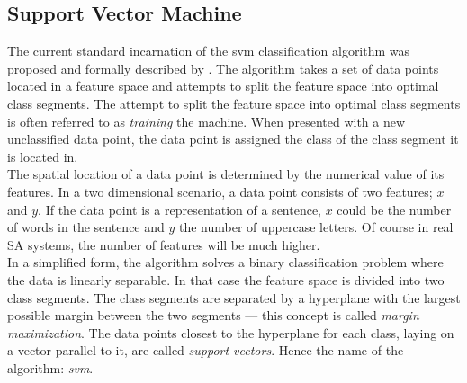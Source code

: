 \subsection*{Support Vector Machine}
\label{sec:svm}
The current standard incarnation of the \ac{svm} classification algorithm was proposed and formally described by \cite{VapnikCortes1995}. The algorithm takes a set of data points located in a feature space and attempts to split the feature space into optimal class segments. The attempt to split the feature space into optimal class segments is often referred to as \textit{training} the machine. When presented with a new unclassified data point, the data point is assigned the class of the class segment it is located in. \\

The spatial location of a data point is determined by the numerical value of its features. In a two dimensional scenario, a data point consists of two features; $x$ and $y$. If the data point is a representation of a sentence, $x$ could be the number of words in the sentence and $y$ the number of uppercase letters. Of course in real SA systems, the number of features will be much higher.  \\

In a simplified form, the algorithm solves a binary classification problem where the data is linearly separable. In that case the feature space is divided into two class segments. The class segments are separated by a hyperplane with the largest possible margin between the two segments --- this concept is called \textit{margin maximization}. The data points closest to the hyperplane for each class, laying on a vector parallel to it, are called \textit{support vectors}. Hence the name of the algorithm: \textit{\acl{svm}}. \\

